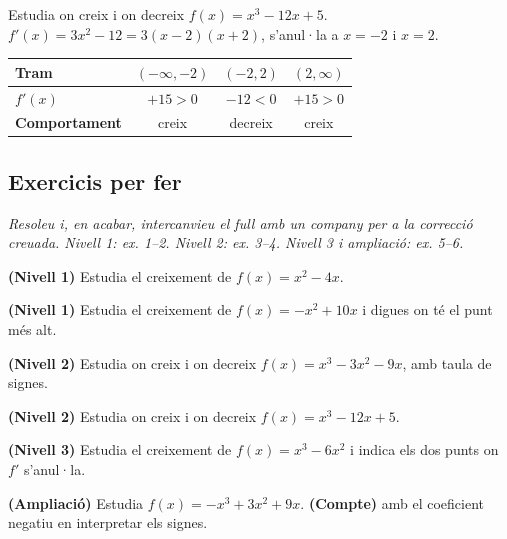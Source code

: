 \begin{exresolt}
Estudia on creix i on decreix $f(x)=x^3-12x+5$.
\solucio
$f'(x)=3x^2-12=3(x-2)(x+2)$, s'anul·la a $x=-2$ i $x=2$.
\begin{center}
\renewcommand{\arraystretch}{1.3}
\begin{tabular}{l c c c}
\toprule
\textbf{Tram} & $(-\infty,-2)$ & $(-2,2)$ & $(2,\infty)$ \\
\midrule
$f'(x)$ & $+15>0$ & $-12<0$ & $+15>0$ \\
\textbf{Comportament} & creix & decreix & creix \\
\bottomrule
\end{tabular}
\end{center}
\end{exresolt}

\subsection{Exercicis per fer}

\noindent\textit{Resoleu i, en acabar, intercanvieu el full amb un company per a la
correcció creuada. Nivell 1: ex. 1--2. Nivell 2: ex. 3--4. Nivell 3 i ampliació:
ex. 5--6.}

\begin{exercicis}
\begin{exlist}
  \item \textbf{(Nivell 1)} Estudia el creixement de $f(x)=x^2-4x$.
  \item \textbf{(Nivell 1)} Estudia el creixement de $f(x)=-x^2+10x$ i digues on té el
        punt més alt.
  \item \textbf{(Nivell 2)} Estudia on creix i on decreix $f(x)=x^3-3x^2-9x$, amb taula
        de signes.
  \item \textbf{(Nivell 2)} Estudia on creix i on decreix $f(x)=x^3-12x+5$.
  \item \textbf{(Nivell 3)} Estudia el creixement de $f(x)=x^3-6x^2$ i indica els dos
        punts on $f'$ s'anul·la.
  \item \textbf{(Ampliació)} Estudia $f(x)=-x^3+3x^2+9x$. \textbf{(Compte)} amb el
        coeficient negatiu en interpretar els signes.
\end{exlist}
\end{exercicis}

